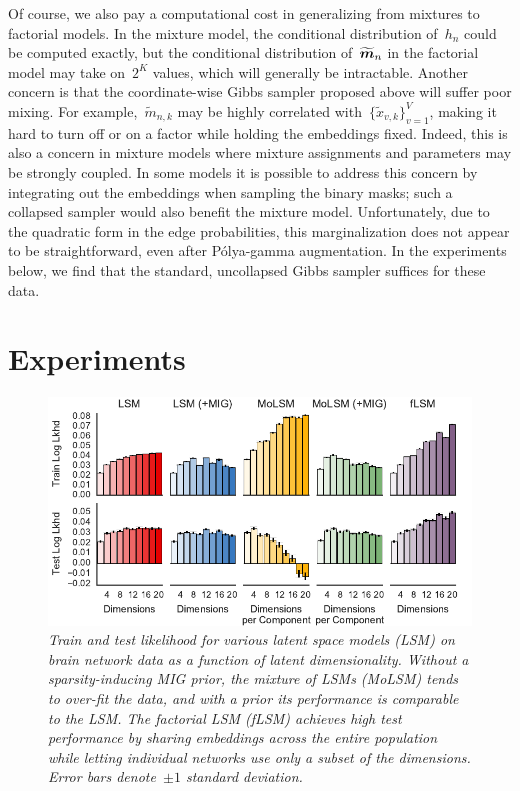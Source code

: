 Of course, we also pay a computational cost in generalizing from
mixtures to factorial models.  In the mixture model, the conditional
distribution of~$h_n$ could be computed exactly, but the conditional
distribution of~$\widetilde{\boldsymbol{m}}_n$ in the factorial model may take
on~$2^K$ values, which will generally be intractable.  Another concern is
that the coordinate-wise Gibbs sampler proposed above will suffer poor
mixing. For example,~$\widetilde{m}_{n,k}$ may be highly correlated
with~$\{\widetilde{x}_{v,k}\}_{v=1}^V$, making it hard to turn off or
on a factor while holding the embeddings fixed. Indeed, this is also a
concern in mixture models where mixture assignments and parameters may
be strongly coupled. In some models it is possible to address this
concern by integrating out the embeddings when sampling the binary
masks; such a collapsed sampler would also benefit the mixture model.
Unfortunately, due to the quadratic form in the edge probabilities,
this marginalization does not appear to be straightforward, even after
P\'{o}lya-gamma augmentation.  In the experiments below, we find that
the standard, uncollapsed Gibbs sampler suffices for these data. 

\section{Experiments}



\begin{figure}[t]
\includegraphics[width=\linewidth]{figures/lls.pdf}
\caption{\textit{Train and test likelihood for various
    latent space models (LSM) on brain network data as a function of
    latent dimensionality. Without a sparsity-inducing MIG prior,
    the mixture of LSMs (MoLSM) tends to over-fit the data, and with a prior its
    performance is comparable to the LSM.  The factorial LSM (fLSM)
    achieves high test performance by sharing embeddings across the
    entire population while letting individual networks use only a subset
    of the dimensions. Error bars denote~$\pm 1$ standard deviation.}}
\label{fig:lls}
\end{figure}


